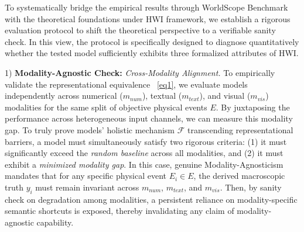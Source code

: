 To systematically bridge the empirical results through WorldScope Benchmark with the theoretical foundations under HWI framework, we establish a rigorous evaluation protocol to shift the theoretical perspective to a verifiable sanity check. In this view, the protocol is specifically designed to diagnose quantitatively whether the tested model sufficiently exhibits three formalized attributes of HWI.

1) \textbf{Modality-Agnostic Check:} \emph{Cross-Modality Alignment.} 
To empirically validate the representational equivalence ~\ref{eq1}, we evaluate models independently across numerical ($m_{num}$), textual ($m_{text}$), and visual ($m_{vis}$) modalities for the same split of objective physical events $E$. 
By juxtaposing the performance across heterogeneous input channels, we can measure this modality gap. 
To truly prove models' holistic mechanism $\mathcal{F}$ transcending representational barriers, a model must simultaneously satisfy two rigorous criteria: (1) it must significantly exceed the \emph{random baseline} across all modalities, and (2) it must exhibit a \emph{minimized modality gap}.
In this case, genuine Modality-Agnosticism mandates that for any specific physical event $E_i \in E$, the derived macroscopic truth $y_i$ must remain invariant across $m_{num}$, $m_{text}$, and $m_{vis}$. 
Then, by sanity check on degradation among modalities, a persistent reliance on modality-specific semantic shortcuts is exposed, thereby invalidating any claim of modality-agnostic capability.


